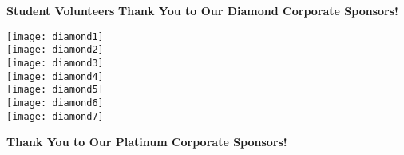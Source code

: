 \documentclass[twoside]{article}
\begin{document}
    { \fontsize{14}{17}\selectfont \bf Student Volunteers}\newpage
    \notepages
    { \fontsize{16}{19}\selectfont \bf Thank You to Our Diamond Corporate Sponsors!}\\
    \begin{center}\vspace{-1.3em}
    \begin{adjustbox}{max size={0.65\textwidth}{!}}\texttt{[image: diamond1]}\end{adjustbox}\vspace{1em}\\
        \begin{adjustbox}{max size={0.65\textwidth}{!}}\texttt{[image: diamond2]}\end{adjustbox}\vspace{1em}\\
        \begin{adjustbox}{max size={0.65\textwidth}{!}}\texttt{[image: diamond3]}\end{adjustbox}\vspace{1em}\\
        \begin{adjustbox}{max size={0.65\textwidth}{!}}\texttt{[image: diamond4]}\end{adjustbox}\vspace{1em}\\
        \begin{adjustbox}{max size={0.65\textwidth}{!}}\texttt{[image: diamond5]}\end{adjustbox}\vspace{1em}\\
        \begin{adjustbox}{max size={0.65\textwidth}{!}}\texttt{[image: diamond6]}\end{adjustbox}\vspace{1em}\\
        \begin{adjustbox}{max size={0.65\textwidth}{!}}\texttt{[image: diamond7]}\end{adjustbox}\vspace{1em}\\
        \end{center}
    \newpage
    { \fontsize{16}{19}\selectfont \bf Thank You to Our Platinum Corporate Sponsors!}
\end{document}
